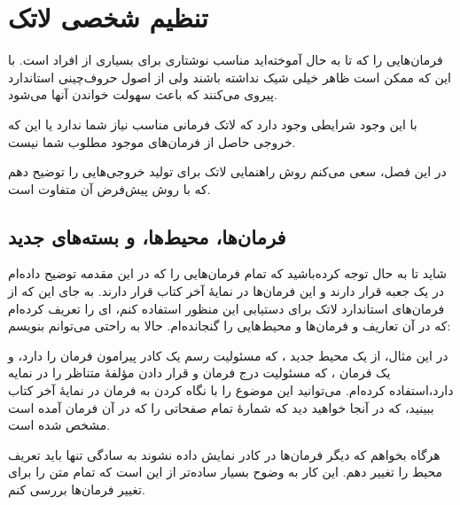 \chapter{تنظیم شخصی لاتک}
\begin{intro}

فرمان‌هایی را که تا به حال آموخته‌اید مناسب نوشتار‌‌ی برای بسیاری از افراد است. با این که ممکن است ظاهر خیلی شیک نداشته باشند ولی از اصول حروف‌چینی استاندارد پیروی می‌کنند که باعث سهولت خواندن آنها می‌شود.

با این وجود شرایطی وجود دارد که لاتک فرمانی مناسب نیاز شما ندارد یا این که خروجی حاصل از فرما‌ن‌های موجود مطلوب شما نیست.

در این فصل، سعی می‌کنم روش راهنمایی لاتک برای تولید خروجی‌هایی را توضیح دهم که با روش پیش‌فرض آن متفاوت است.


\end{intro}
\section{فرمان‌ها، محیط‌ها، و بسته‌های جدید}
شاید تا به حال توجه کرده‌باشید که تمام فرمان‌هایی را که در این مقدمه توضیح داده‌ام در یک جعبه قرار دارند و این فرمان‌ها در نمایهٔ آخر کتاب قرار دارند. به جای این که از فرمان‌های استاندارد لاتک برای دستیابی این منظور استفاده کنم،  ‌ای
را تعریف کرده‌ام که در آن تعاریف و فرمان‌ها و محیط‌هایی را گنجانده‌ام. حالا به راحتی می‌توانم بنویسم:


\begin{example}
\begin{lscommand}
\end{lscommand}
\end{example}


در این مثال، از یک محیط جدید ، که مسئولیت رسم یک کادر پیرامون فرمان را دارد، و یک فرمان  ، که مسئولیت درج فرمان و قرار دادن مؤلفهٔ متناظر را در نمایه دارد،استفاده کرده‌ام. می‌توانید این موضوع را با نگاه کردن به فرمان   در نمایهٔ آخر کتاب ببینید، که در آنجا خواهید دید که شمارهٔ تمام صفحاتی را که در آن فرمان   آمده است مشخص شده است.

هرگاه بخواهم که دیگر فرمان‌ها در کادر نمایش داده نشوند به سادگی تنها باید تعریف محیط   را تغییر دهم. این کار به وضوح بسیار ساده‌تر از این است که تمام متن را برای تغییر فرمان‌ها بررسی کنم.
